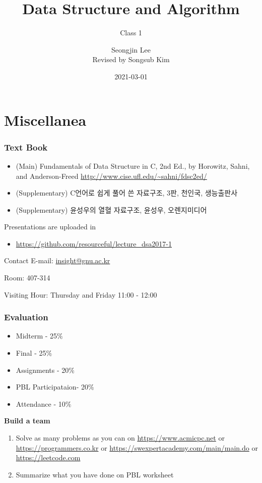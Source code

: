\documentclass[newPxFont,sthlmFooter,nooffset]{beamer}
\title{Data Structure and Algorithm}
\subtitle{Class 1}
\author[SJL]{Seongjin Lee\\{\footnotesize Revised by Songsub Kim}}
\institute{\href{mailto:insight@gnu.ac.kr}{insight@gnu.ac.kr}\\\url{http://resourceful.github.io}\\Systems Research Lab.\\GNU}
\date{2021-03-01}
\begin{document}
\frame[plain,t]{\titlepage} 



\section{Miscellanea} %



\begin{frame}[t]
  \frametitle{Text Book}

  \begin{itemize}
  \item (Main) Fundamentals of Data Structure in C, 2nd Ed., by Horowitz, Sahni, and Anderson-Freed \url{http://www.cise.ufl.edu/~sahni/fdsc2ed/}
  \item (Supplementary) C언어로 쉽게 풀어 쓴 자료구조, 3판, 천인국, 생능출판사
  \item (Supplementary) 윤성우의 열혈 자료구조, 윤성우, 오렌지미디어
  \end{itemize}

Presentations are uploaded in 
\begin{itemize}
\item \url{https://github.com/resourceful/lecture_dsa2017-1}
\end{itemize}
\end{frame}

\begin{frame}[t]{Contact}
E-mail: \url{insight@gnu.ac.kr}

Room: 407-314

Visiting Hour: Thursday and Friday 11:00 - 12:00

\end{frame}

\begin{frame}[t]
  \frametitle{Evaluation}
  \begin{itemize}
  \item Midterm - 25$\%$
  \item Final - 25$\%$
  \item Assignments - 20$\%$
  \item PBL Participataion- 20$\%$
  \item Attendance - 10$\%$
  \end{itemize}

\textbf{Build a team}
\begin{enumerate}
\item Solve as many problems as you can on \url{https://www.acmicpc.net} or \url{https://programmers.co.kr} or \url{https://swexpertacademy.com/main/main.do} or \url{https://leetcode.com}
\item Summarize what you have done on PBL worksheet
\end{enumerate}

\end{frame}
\end{document}
